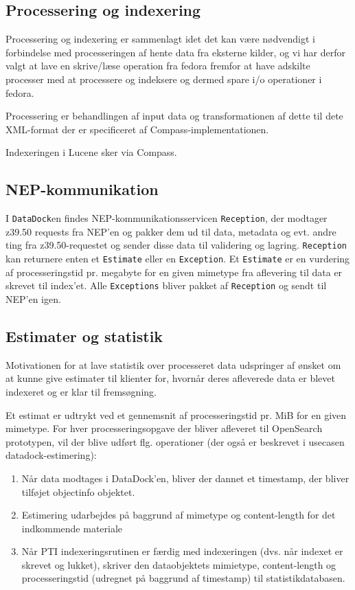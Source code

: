 \documentclass{article}
\begin{document}
\subsection{Processering og indexering}

Processering og indexering er sammenlagt idet det kan være nødvendigt
i forbindelse med processeringen af hente data fra eksterne kilder, og
vi har derfor valgt at lave en skrive/læse operation fra fedora
fremfor at have adskilte processer med at processere og indeksere og
dermed spare i/o operationer i fedora.

Processering er behandlingen af input data og transformationen af
dette til dete XML-format der er specificeret af
Compass-implementationen.

Indexeringen i Lucene sker via Compass.

\subsection{NEP-kommunikation}

I \texttt{DataDock}en findes NEP-kommunikationsservicen
\texttt{Reception}, der modtager z39.50 requests fra NEP'en og pakker
dem ud til data, metadata og evt. andre ting fra z39.50-requestet og
sender disse data til validering og lagring. \texttt{Reception} kan
returnere enten et \texttt{Estimate} eller en \texttt{Exception}. Et
\texttt{Estimate} er en vurdering af processeringstid pr. megabyte for
en given mimetype fra aflevering til data er skrevet til
index'et. Alle \texttt{Exceptions} bliver pakket af \texttt{Reception}
og sendt til NEP'en igen.

\subsection{Estimater og statistik}

Motivationen for at lave statistik over processeret data udspringer af
ønsket om at kunne give estimater til klienter for, hvornår deres
afleverede data er blevet indexeret og er klar til fremsøgning.

Et estimat er udtrykt ved et gennemsnit af processeringstid pr. MiB
for en given mimetype. For hver processeringsopgave der bliver
afleveret til OpenSearch prototypen, vil der blive udført
flg. operationer (der også er beskrevet i usecasen
datadock-estimering):

\begin{enumerate}
\item Når data modtages i DataDock'en, bliver der dannet et timestamp,
  der bliver tilføjet objectinfo objektet.
\item Estimering udarbejdes på baggrund af mimetype og content-length
  for det indkommende materiale
\item Når PTI indexeringsrutinen er færdig med indexeringen (dvs. når
  indexet er skrevet og lukket), skriver den dataobjektets mimietype,
  content-length og processeringstid (udregnet på baggrund af
  timestamp) til statistikdatabasen.
\end{enumerate}
\end{document}
